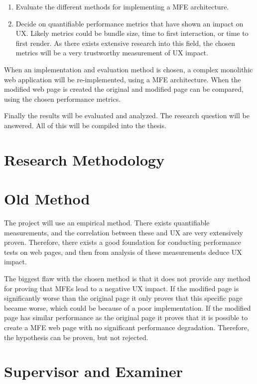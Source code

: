 \begin{enumerate}
    \item Evaluate the different methods for implementing a \ac{MFE} architecture.
    \item Decide on quantifiable performance metrics that have shown an impact on \ac{UX}. Likely metrics could be bundle size, time to first interaction, or time to first render. As there exists extensive research into this field, the chosen metrics will be a very trustworthy measurement of \ac{UX} impact.
\end{enumerate}

When an implementation and evaluation method is chosen, a complex monolithic web application will be re-implemented, using a \ac{MFE} architecture. When the modified web page is created the original and modified page can be compared, using the chosen performance metrics.

Finally the results will be evaluated and analyzed. The research question will be answered. All of this will be compiled into the thesis.

\section{Research Methodology}

\section{Old Method}
The project will use an empirical method. There exists quantifiable measurements, and the correlation between these and \ac{UX} are very extensively proven. Therefore, there exists a good foundation for conducting performance tests on web pages, and then from analysis of these measurements deduce \ac{UX} impact.

The biggest flaw with the chosen method is that it does not provide any method for proving that \acp{MFE} lead to a negative \ac{UX} impact. If the modified page is significantly worse than the original page it only proves that this specific page became worse, which could be because of a poor implementation. If the modified page has similar performance as the original page it proves that it is possible to create a \ac{MFE} web page with no significant performance degradation. Therefore, the hypothesis can be proven, but not rejected.

\section{Supervisor and Examiner}

